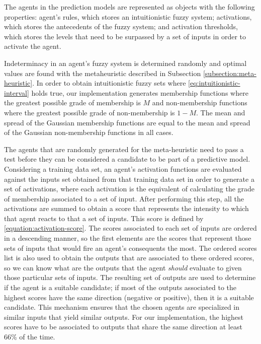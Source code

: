 \documentclass{ieeeaccess}
\begin{document}
The agents in the prediction models are represented as objects with
the following properties: agent's rules, which stores an
intuitionistic fuzzy system; activations, which stores the antecedents
of the fuzzy system; and activation thresholds, which stores the
levels that need to be surpassed by a set of inputs in order to
activate the agent.

Indeterminacy in an agent's fuzzy system is determined randomly and
optimal values are found with the metaheuristic described in
Subsection \ref{subsection:meta-heuristic}. In order to obtain
intuitionistic fuzzy sets where \ref{eq:intuitionistic-interval} holds
true, our implementation generates membership functions where the
greatest possible grade of membership is $M$ and non-membership
functions where the greatest possible grade of non-membership is $1 -
M$. The mean and spread of the Gaussian membership functions are
equal to the mean and spread of the Gaussian non-membership functions
in all cases.

The agents that are randomly generated for the meta-heuristic need to
pass a test before they can be considered a candidate to be part of a
predictive model. Considering a training data set, an agent's
activation functions are evaluated against the inputs set obtained
from that training data set in order to generate a set of activations,
where each activation is the equivalent of calculating the grade of
membership associated to a set of input. After performing this step,
all the activations are summed to obtain a score that represents the
intensity to which that agent reacts to that a set of inputs. This
score is defined by \ref{equation:activation-score}. The scores
associated to each set of inputs are ordered in a descending manner,
so the first elements are the scores that represent those sets of
inputs that would fire an agent's consequents the most. The ordered
scores list is also used to obtain the outputs that are associated to
these ordered scores, so we can know what are the outputs that the
agent \textit{should} evaluate to given those particular sets of
inputs. The resulting set of outputs are used to determine if the
agent is a suitable candidate; if most of the outputs associated to
the highest scores have the same direction (negative or positive),
then it is a suitable candidate. This mechanism ensures that the
chosen agents are specialized in similar inputs that yield similar
outputs. For our implementation, the highest scores have to be
associated to outputs that share the same direction at least 66\% of
the time.
\end{document}

